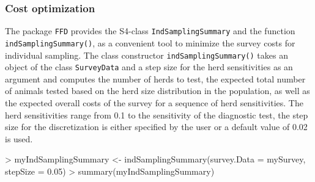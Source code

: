 \documentclass[nojss]{jss}
\begin{document}
\subsubsection{Cost optimization}

The package \texttt{FFD} provides the S4-class \texttt{IndSamplingSummary}   and the function \texttt{indSamplingSummary()},  as a convenient tool to minimize the survey costs for individual sampling. The class constructor \texttt{indSamplingSummary()} takes an object of the class \texttt{SurveyData} and a step size for the herd sensitivities as an argument and computes the number of herds to test, the expected total number of animals tested based on the herd size distribution in the population, as well as the expected overall costs of the survey for a sequence of herd sensitivities. The herd sensitivities range from 0.1 to the sensitivity of the diagnostic test, the step size for the discretization is either specified by the user or a default value of 0.02 is used.

\begin{Schunk}
\begin{Sinput}
> myIndSamplingSummary <- indSamplingSummary(survey.Data = mySurvey,
       stepSize = 0.05)
> summary(myIndSamplingSummary)
\end{Sinput}
\end{Schunk}
\end{document}
